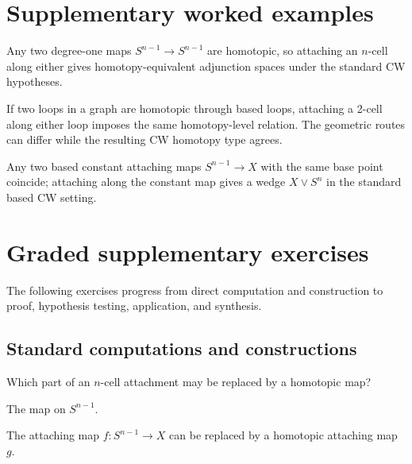 \section{Supplementary worked examples}
\label{sec:viii08-pedagogy}

\begin{example}\label{ex:viii08-ped-01}
Any two degree-one maps $S^{n-1}\to S^{n-1}$ are homotopic, so attaching an $n$-cell along either gives homotopy-equivalent adjunction spaces under the standard CW hypotheses.
\end{example}

\begin{example}\label{ex:viii08-ped-02}
If two loops in a graph are homotopic through based loops, attaching a 2-cell along either loop imposes the same homotopy-level relation.  The geometric routes can differ while the resulting CW homotopy type agrees.
\end{example}

\begin{example}\label{ex:viii08-ped-03}
Any two based constant attaching maps $S^{n-1}\to X$ with the same base point coincide; attaching along the constant map gives a wedge $X\vee S^n$ in the standard based CW setting.
\end{example}

\section{Graded supplementary exercises}
The following exercises progress from direct computation and construction to proof, hypothesis testing, application, and synthesis.

\subsection*{Standard computations and constructions}

\begin{exercise}\label{exr:viii08-ped-01}
Which part of an $n$-cell attachment may be replaced by a homotopic map?
\end{exercise}
\begin{hint}
The map on $S^{n-1}$.
\end{hint}
\begin{solution}
The attaching map $f:S^{n-1}\to X$ can be replaced by a homotopic attaching map $g$.
\end{solution}

